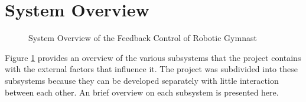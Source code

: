 \begin{comment}
\begin{figure}
	\centering
	
	\caption{State Space Representation with Feedback Gain}
	\label{fig:linearSys}
\end{figure}

\begin{equation} \label{eq:closedSysFeedback}
\centering
\text{det}[s\boldsymbol{I}-(\boldsymbol{A}-\boldsymbol{B}\boldsymbol{K})] = 0
\end{equation}

The classical approach to controlling a system is by implementing a controller which reacts on the error of the desired state and the current state. These controllers are more commonly known as PID-controllers where the controller equation is shown in (\ref{eq:PID}).

\begin{equation} \label{eq:PID}
\centering
u(t) = K[ e(t)+K_{I}\int_{0}^{t}e(\tau)d\tau +K_{D}\frac{de(t)}{dt}]
\end{equation}

Each term represent an effect it has on the system response when the PID-controller is implemented shown in Figure \ref{fig:PIDcontroller}. If the system or plant is assumed to be a second-order differential equation represented by:
\begin{equation} \label{eq:PID_system}
\centering
\dddot{q}+(2\zeta\omega_{n}+K_{D})\ddot{q}+(\omega_{n}^2+K_{P})\dot{q}+K_{I} = 0
\end{equation}

From equation (7) it is visible that by tuning the PID constants the response of the system can controlled.
\end{comment}


\section{System Overview}
\begin{figure}[h]
	\centering
	
	\caption{System Overview of the Feedback Control of Robotic Gymnast}
	\label{fig:system_overview}
\end{figure}


Figure \ref{fig:system_overview} provides an overview of the various subsystems that the project contains with the external factors that influence it. The project was subdivided into these subsystems because they can be developed separately with little interaction between each other. An brief overview on each subsystem is presented here.\\

